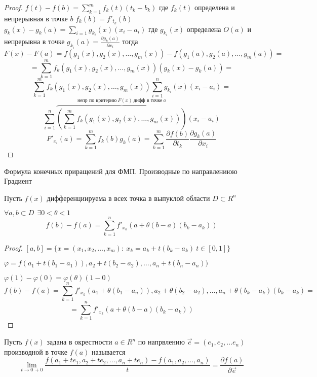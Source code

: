 \begin{proof}
  $f(t) - f(b) = \sum_{k=1}^m f_k(t)(t_k - b_k)$ где $f_k(t)$ определена и
  непрерывная в точке $b$ $f_k(b) = f'_{t_k}(b)$ $g_k(x) - g_k(a) =
  \sum_{i=1}g_{k_i}(x)(x_i - a_i)$ где $g_{k_i}(x)$ определена $O(a)$ и
  непрерывна в точке $g_{k_i}(a) = \frac{\partial g_k(a)}{\partial x_i}$ тогда
  $$
  F(x) - F(a) = f(g_1(x), g_2(x), \ldots, g_m(x)) - f(g_1(a), g_2(a),
  \ldots, g_m(a)) =
  $$
  $$
  = \sum_{k=1}^m f_k(g_1(x), g_2(x), \ldots, g_m(x)) (g_k(x) - g_k(a)) =
  $$
  $$
  \sum_{k=1}^m f_k(g_1(x), g_2(x), \ldots, g_m(x)) \sum_{i=1}^n g_{k_i}(x)
  (x_i - a_i)=
  $$
  $$
  \sum_{i=1}^n \overbrace{\left( \sum_{k=1}^m f_k(g_1(x), g_2(x), \ldots,
  g_m(x)) \right)}^{\text{непр по критерию} ~ F(x) ~ \text{дифф в точке} ~ a}
  (x_i - a_i)
  $$
  $$
  F'_{x_i}(a) = \sum_{k=1}^m f_k(b) g_k(a) = \sum_{k=1}^m
  \frac{\partial f(b)}{\partial t_k} \frac{\partial g_k(a)}{\partial x_i}
  $$
\end{proof}

\begin{title}[\Large]
  Формула конечных приращений для ФМП. Производные по направлениюю Градиент
\end{title}

\begin{theorem}
  Пусть $f(x)$ дифференциируема в всех точка в выпуклой области $D \subset R^n$

  $\forall a,b \subset D ~~ \exists 0 < \theta < 1$
  $$
  f(b) - f(a) = \sum_{k=1}^n f'_{x_k} (a + \theta(b-a)(b_k-a_k))
  $$
\end{theorem}

\begin{proof}
  $[a,b] = \{x = (x_1, x_2, \ldots, x_m): ~ x_k = a_k + t(b_k - a_k) ~
  t \in [0,1]\}$

  $\varphi = f(a_1 + t(b_1 - a_1)), a_2 + t(b_2 - a_2), \ldots,
  a_n + t(b_n-a_n))$

  $\varphi(1) - \varphi(0) = \varphi(\theta) (1 - 0)$
  $$
  f(b) - f(a) = \sum_{k=1}^n f'_{x_k}(a_1 + \theta(b_1 - a_n)),
  a_2 + \theta(b_2 - a_2), \ldots, a_n + \theta(b_k - a_k) (b_k - a_k) =
  $$
  $$
  = \sum_{k=1}^n f'_{x_k}(a + \theta(b-a)(b_k - a_k))
  $$
\end{proof}

\begin{define}
  Пусть $f(x)$ задана в окрестности $a \in R^n$ по напрвлению
  $\vec e = (e_1, e_2, \ldots e_n)$ производной в точке $f(a)$ называется
  $$
  \lim_{t \to 0 ~ +0} \frac{f(a_1 + te_1, a_2 + te_2, \ldots, a_n + te_n) -
  f(a_1, a_2, \ldots, a_n)}{t} = \frac{\partial f(a)}{\partial \vec e}
  $$
\end{define}

